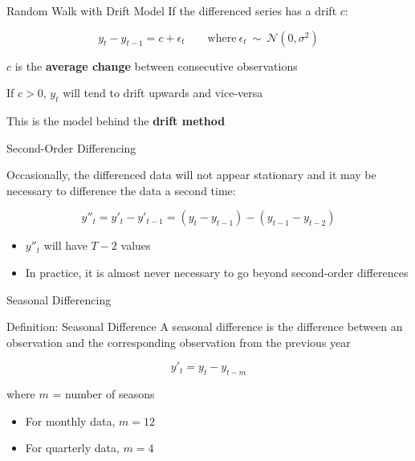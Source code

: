 \documentclass{beamer}
\newenvironment{wideitemize}{\itemize\addtolength{\itemsep}{10pt}}{\enditemize}
\begin{document}
\begin{frame}{Random Walk with Drift Model}
  If the differenced series has a drift $c$:

  \begin{equation*}
    y_t - y_{t-1} = c + \epsilon_t \qquad \text{where} \ \epsilon_t \ \sim \ \mathcal{N}(0, \sigma^2)
  \end{equation*}
  
  \begin{wideitemize}
  \item $c$ is the \textbf{average change} between consecutive observations
  \item If $c > 0$, $y_t$ will tend to drift upwards and vice-versa
  \item This is the model behind the \textbf{drift method} 
  \end{wideitemize}  
\end{frame}



\begin{frame}{Second-Order Differencing}

  Occasionally, the differenced data will not appear stationary and it may be necessary to difference the data a second time:\\

  \medskip
  
  \begin{equation*}
    y''_{t} = y'_t - y'_{t-1} = (y_t - y_{t-1}) - (y_{t-1} - y_{t-2})
  \end{equation*}

  \medskip

  \begin{itemize}
  \item $y''_{t}$ will have $T-2$ values
  \item In practice, it is almost never necessary to go beyond second-order differences
  \end{itemize}
  
\end{frame}


\begin{frame}{Seasonal Differencing}

  \begin{block}{Definition: Seasonal Difference}
    A seasonal difference is the difference between an observation and the corresponding observation from the previous year

    \begin{equation*}
      y'_t = y_t - y_{t-m}
    \end{equation*}

    where $m$ = number of seasons


    \begin{itemize}
    \item For monthly data, $m = 12$
    \item For quarterly data, $m = 4$      
    \end{itemize}
    
  \end{block}
\end{frame}
\end{document}
